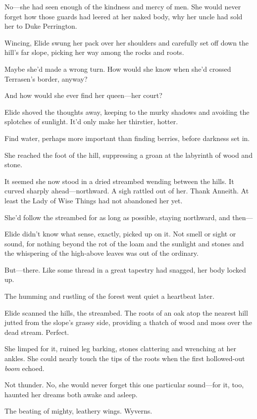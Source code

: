 No---she had seen enough of the kindness and mercy of men.
She would never forget how those guards had leered at her naked body, why her uncle had sold her to Duke Perrington.

Wincing, Elide swung her pack over her shoulders and carefully set off down the hill's far slope, picking her way among the rocks and roots.

Maybe she'd made a wrong turn.
How would she know when she'd crossed Terrasen's border, anyway?

And how would she ever find her queen---her court?

Elide shoved the thoughts away, keeping to the murky shadows and avoiding the splotches of sunlight.
It'd only make her thirstier, hotter.

Find water, perhaps more important than finding berries, before darkness set in.

She reached the foot of the hill, suppressing a groan at the labyrinth of wood and stone.

It seemed she now stood in a dried streambed wending between the hills.
It curved sharply ahead---northward.
A sigh rattled out of her.
Thank Anneith.
At least the Lady of Wise Things had not abandoned her yet.

She'd follow the streambed for as long as possible, staying northward, and then---

Elide didn't know what sense, exactly, picked up on it.
Not smell or sight or sound, for nothing beyond the rot of the loam and the sunlight and stones and the whispering of the high-above leaves was out of the ordinary.

But---there.
Like some thread in a great tapestry had snagged, her body locked up.

The humming and rustling of the forest went quiet a heartbeat later.

Elide scanned the hills, the streambed.
The roots of an oak atop the nearest hill jutted from the slope's grassy side, providing a thatch of wood and moss over the dead stream.
Perfect.

She limped for it, ruined leg barking, stones clattering and wrenching at her ankles.
She could nearly touch the tips of the roots when the first hollowed-out \emph{boom} echoed.

Not thunder.
No, she would never forget this one particular sound---for it, too, haunted her dreams both awake and asleep.

The beating of mighty, leathery wings.
Wyverns.

